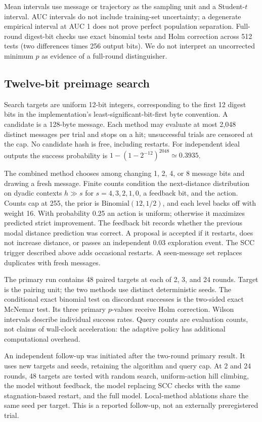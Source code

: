 \documentclass[11pt]{article}
\begin{document}
Mean intervals use message or trajectory as the sampling unit and a Student-$t$ interval. AUC intervals do not include training-set uncertainty; a degenerate empirical interval at AUC 1 does not prove perfect population separation. Full-round digest-bit checks use exact binomial tests and Holm correction across 512 tests (two differences times 256 output bits). We do not interpret an uncorrected minimum $p$ as evidence of a full-round distinguisher.

\subsection{Twelve-bit preimage search}

Search targets are uniform 12-bit integers, corresponding to the first 12 digest bits in the implementation's least-significant-bit-first byte convention. A candidate is a 128-byte message. Each method may evaluate at most 2,048 distinct messages per trial and stops on a hit; unsuccessful trials are censored at the cap. No candidate hash is free, including restarts. For independent ideal outputs the success probability is $1-(1-2^{-12})^{2048}\simeq0.3935$.

The combined method chooses among changing 1, 2, 4, or 8 message bits and drawing a fresh message. Finite counts condition the next-distance distribution on dyadic contexts $h\mathbin{\gg}s$ for $s=4,3,2,1,0$, a feedback bit, and the action. Counts cap at 255, the prior is $\mathrm{Binomial}(12,1/2)$, and each level backs off with weight 16. With probability 0.25 an action is uniform; otherwise it maximizes predicted strict improvement. The feedback bit records whether the previous modal distance prediction was correct. A proposal is accepted if it restarts, does not increase distance, or passes an independent 0.03 exploration event. The SCC trigger described above adds occasional restarts. A seen-message set replaces duplicates with fresh messages.

The primary run contains 48 paired targets at each of 2, 3, and 24 rounds. Target is the pairing unit; the two methods use distinct deterministic seeds. The conditional exact binomial test on discordant successes is the two-sided exact McNemar test. Its three primary $p$-values receive Holm correction. Wilson intervals describe individual success rates. Query counts are evaluation counts, not claims of wall-clock acceleration: the adaptive policy has additional computational overhead.

An independent follow-up was initiated after the two-round primary result. It uses new targets and seeds, retaining the algorithm and query cap. At 2 and 24 rounds, 48 targets are tested with random search, uniform-action hill climbing, the model without feedback, the model replacing SCC checks with the same stagnation-based restart, and the full model. Local-method ablations share the same seed per target. This is a reported follow-up, not an externally preregistered trial.
\end{document}
